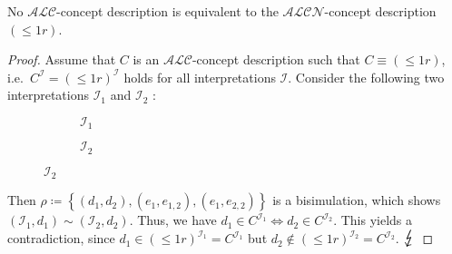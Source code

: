 \begin{prop}
	No $\mathcal{ALC}$-concept description is equivalent to the $\mathcal{ALCN}$-concept description $\left( \leq 1 r \right)$.
\end{prop}
\begin{proof}
	Assume that $C$ is an $\mathcal{ALC}$-concept description such that $C \equiv ( \leq 1 r )$, i.e.\ $C^{\mathcal{I}} = \left( \leq 1 r \right)^\mathcal{I}$ holds for all interpretations $\mathcal{I}$.
	Consider the following two interpretations $\mathcal{I}_1$ and $\mathcal{I}_2$ :
	\begin{figure}[H]
		\centering
		\begin{subfigure}[t]{.475\textwidth}
			\centering
			\caption{$\mathcal{I}_1$}
		\end{subfigure}
		\hfill
		\begin{subfigure}[t]{.475\textwidth}
			\centering
			\caption{$\mathcal{I}_2$}
		\end{subfigure}
	\end{figure}
	Then $\rho \coloneqq \left\{ (d_1,d_2), (e_1,e_{1,2}), (e_1,e_{2,2}) \right\}$ is a bisimulation, which shows $(\mathcal{I}_1, d_1) \sim (\mathcal{I}_2,d_2)$.
	Thus, we have $d_1 \in C^{\mathcal{I}_1} \iff d_2 \in C^{\mathcal{I}_2}$.
	This yields a contradiction, since $d_1 \in ( \leq 1r)^{\mathcal{I}_1} = C^{\mathcal{I}_1}$ but $d_2 \notin ( \leq 1r)^{\mathcal{I}_2} = C^{\mathcal{I}_2}$. $\contra$
\end{proof}

